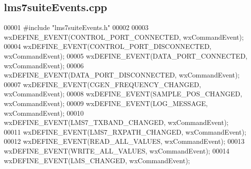 \subsection{lms7suite\+Events.\+cpp}
\label{lms7suiteEvents_8cpp_source}

\begin{DoxyCode}
00001 \textcolor{preprocessor}{#include "lms7suiteEvents.h"}
00002 
00003 wxDEFINE_EVENT(CONTROL\_PORT\_CONNECTED, wxCommandEvent);
00004 wxDEFINE_EVENT(CONTROL\_PORT\_DISCONNECTED, wxCommandEvent);
00005 wxDEFINE_EVENT(DATA\_PORT\_CONNECTED, wxCommandEvent);
00006 wxDEFINE_EVENT(DATA\_PORT\_DISCONNECTED, wxCommandEvent);
00007 wxDEFINE_EVENT(CGEN\_FREQUENCY\_CHANGED, wxCommandEvent);
00008 wxDEFINE_EVENT(SAMPLE\_POS\_CHANGED, wxCommandEvent);
00009 wxDEFINE_EVENT(LOG\_MESSAGE, wxCommandEvent);
00010 wxDEFINE_EVENT(LMS7\_TXBAND\_CHANGED, wxCommandEvent);
00011 wxDEFINE_EVENT(LMS7\_RXPATH\_CHANGED, wxCommandEvent);
00012 wxDEFINE_EVENT(READ\_ALL\_VALUES, wxCommandEvent);
00013 wxDEFINE_EVENT(WRITE\_ALL\_VALUES, wxCommandEvent);
00014 wxDEFINE_EVENT(LMS\_CHANGED, wxCommandEvent);
\end{DoxyCode}
